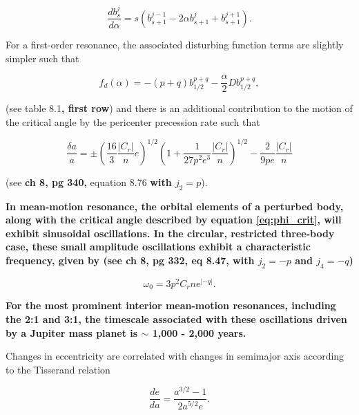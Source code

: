 \documentclass[fleqn,usenatbib]{mnras}
\begin{document}
\begin{equation}\label{eq:lap_d}
	\frac{d b_{s}^{j}}{d \alpha} = s \left( b_{s+1}^{j-1} - 2 \alpha b_{s+1}^{j} + b_{s+1}^{j+1} \right).
\end{equation}

For a first-order resonance, the associated disturbing function terms are slightly simpler such that

\begin{equation}\label{eq:fd_fo}
	f_{d}(\alpha) = -(p+q) b_{1/2}^{p+q} - \frac{\alpha}{2} D b_{1/2}^{p+q},
\end{equation}

\noindent (see \citet{1999ssd..book.....M} table 8.1\textbf{, first row}) and there is an additional contribution to the motion of the critical angle by the pericenter precession rate such that

\begin{equation}\label{eq:res_fo}
	\frac{\delta a}{a} = \pm \left(\frac{16}{3} \frac{\left| C_{r} \right|}{n} e \right)^{1/2} \left(  1 + \frac{1}{27 p^2 e^3} \frac{\left| C_{r} \right|}{n} 
	\right)^{1/2} - \frac{2}{9 p e}  \frac{\left| C_{r} \right|}{n}
\end{equation}

\noindent (see \citet{1999ssd..book.....M} \textbf{ch 8, pg 340,} equation 8.76 \textbf{with $j_{2} = p$}).

\textbf{In mean-motion resonance, the orbital elements of a perturbed body, along with the critical angle described by equation \ref{eq:phi_crit}, will exhibit sinusoidal oscillations. In the circular, restricted three-body case, these small amplitude oscillations exhibit a characteristic frequency, given by (see \citet{1999ssd..book.....M} ch 8, pg 332, eq 8.47, with $j_{2} =-p$ and $j_{4} = -q$)}

\begin{equation}\label{eq:lib_time}
	\omega_{0} = 3 p^{2} C_{r} n e^{\left| -q \right|}.
\end{equation}

\noindent \textbf{For the most prominent interior mean-motion resonances, including the 2:1 and 3:1, the timescale associated with these oscillations driven by a Jupiter mass planet is  $\sim$ 1,000 - 2,000 years.}

Changes in eccentricity are correlated with changes in semimajor axis according to the Tisserand relation

\begin{equation}\label{eq:tiss}
	\frac{de}{da} = \frac{a^{3/2} - 1}{2 a^{5/2} e}.
\end{equation}
\end{document}
